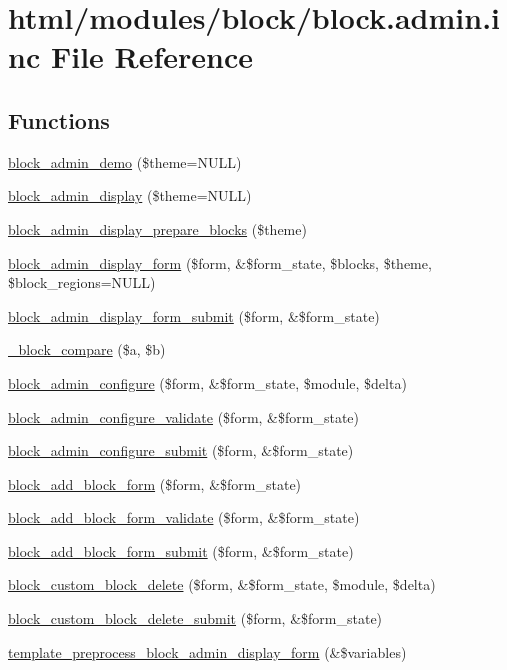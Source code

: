 \hypertarget{block_8admin_8inc}{
\section{html/modules/block/block.admin.inc File Reference}
\label{block_8admin_8inc}
}
\subsection*{Functions}
\begin{DoxyCompactItemize}
\item 
\hyperlink{block_8admin_8inc_ab310f1c23a7db66b3f6b3be6d57abbec}{block\_\-admin\_\-demo} (\$theme=NULL)
\item 
\hyperlink{block_8admin_8inc_a46d186397b98e4faf46681f7f9cd86a1}{block\_\-admin\_\-display} (\$theme=NULL)
\item 
\hyperlink{block_8admin_8inc_af1b2a0aeb8b76a4bc99d435bf5d08fd1}{block\_\-admin\_\-display\_\-prepare\_\-blocks} (\$theme)
\item 
\hyperlink{group__forms_ga19dc9d98e83e7e7c9574298100752ba7}{block\_\-admin\_\-display\_\-form} (\$form, \&\$form\_\-state, \$blocks, \$theme, \$block\_\-regions=NULL)
\item 
\hyperlink{block_8admin_8inc_a9a7a5d16e2db34422f490e08d4bda247}{block\_\-admin\_\-display\_\-form\_\-submit} (\$form, \&\$form\_\-state)
\item 
\hyperlink{block_8admin_8inc_a821b5a94dc38440d9ae55657e4a2c1ea}{\_\-block\_\-compare} (\$a, \$b)
\item 
\hyperlink{group__forms_ga0efaf6e043d69e3fe4f596341f6f90e2}{block\_\-admin\_\-configure} (\$form, \&\$form\_\-state, \$module, \$delta)
\item 
\hyperlink{block_8admin_8inc_a5c45bd363e4fcbacea89a31e60215b47}{block\_\-admin\_\-configure\_\-validate} (\$form, \&\$form\_\-state)
\item 
\hyperlink{block_8admin_8inc_a5f23480eb6a76d82ab516f09baaa2318}{block\_\-admin\_\-configure\_\-submit} (\$form, \&\$form\_\-state)
\item 
\hyperlink{group__forms_ga974d0d9820f12e9a2ce5ae328d0ccdc5}{block\_\-add\_\-block\_\-form} (\$form, \&\$form\_\-state)
\item 
\hyperlink{block_8admin_8inc_a01e910bd6f2a2cab75dde1db2df7af9b}{block\_\-add\_\-block\_\-form\_\-validate} (\$form, \&\$form\_\-state)
\item 
\hyperlink{block_8admin_8inc_ab1b62b97e79a16ab5a83cc746429601d}{block\_\-add\_\-block\_\-form\_\-submit} (\$form, \&\$form\_\-state)
\item 
\hyperlink{block_8admin_8inc_a4a3fd0e8a27350b661073c26ced2912d}{block\_\-custom\_\-block\_\-delete} (\$form, \&\$form\_\-state, \$module, \$delta)
\item 
\hyperlink{block_8admin_8inc_afef082a966e26b8dc09febab599ddbef}{block\_\-custom\_\-block\_\-delete\_\-submit} (\$form, \&\$form\_\-state)
\item 
\hyperlink{block_8admin_8inc_a790da1d1c8cea6bceca5374a4e410c01}{template\_\-preprocess\_\-block\_\-admin\_\-display\_\-form} (\&\$variables)
\end{DoxyCompactItemize}


